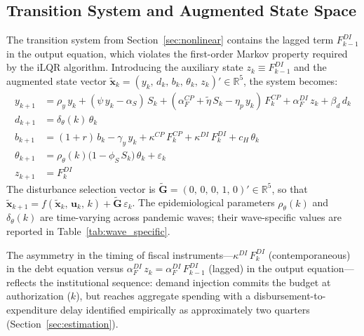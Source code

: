 \documentclass[12pt, a4paper]{article}
\begin{document}
\subsection{Transition System and Augmented State Space}
\label{app:system}

The transition system from Section~\ref{sec:nonlinear} contains the lagged term
$F_{k-1}^{DI}$ in the output equation, which violates the first-order Markov
property required by the iLQR algorithm. Introducing the auxiliary state
$z_k \equiv F_{k-1}^{DI}$ and the augmented state vector
$\tilde{\bm{x}}_k = (y_k,\, d_k,\, b_k,\, \theta_k,\, z_k)' \in \mathbb{R}^5$,
the system becomes:
%
\begin{align}
    y_{k+1} &= \rho_y\, y_k
              + (\psi\, y_k - \alpha_S)\, S_k
              + (\alpha_F^{CP} + \tilde{\eta}\, S_k - \eta_p\, y_k)\, F_k^{CP}
              + \alpha_F^{DI}\, z_k
              + \beta_d\, d_k
    \label{eq:y_aug} \\[1ex]
    d_{k+1} &= \delta_\theta(k)\, \theta_k
    \label{eq:d_aug} \\[1ex]
    b_{k+1} &= (1+r)\, b_k - \gamma_y\, y_k
              + \kappa^{CP}\, F_k^{CP}
              + \kappa^{DI}\, F_k^{DI}
              + c_H\, \theta_k
    \label{eq:b_aug} \\[1ex]
    \theta_{k+1} &= \rho_\theta(k)\bigl(1 - \phi_S\, S_k\bigr)\,\theta_k
              + \varepsilon_k
    \label{eq:theta_aug} \\[1ex]
    z_{k+1} &= F_k^{DI}
    \label{eq:z_aug}
\end{align}
%
The disturbance selection vector is
$\tilde{\bm{G}} = (0,\, 0,\, 0,\, 1,\, 0)' \in \mathbb{R}^5$, so that
$\tilde{\bm{x}}_{k+1} = f(\tilde{\bm{x}}_k,\, \bm{u}_k,\, k) +
\tilde{\bm{G}}\,\varepsilon_k$. The epidemiological parameters $\rho_\theta(k)$
and $\delta_\theta(k)$ are time-varying across pandemic waves; their
wave-specific values are reported in Table~\ref{tab:wave_specific}.

The asymmetry in the timing of fiscal instruments---$\kappa^{DI}\, F_k^{DI}$
(contemporaneous) in the debt equation versus $\alpha_F^{DI}\, z_k =
\alpha_F^{DI}\, F_{k-1}^{DI}$ (lagged) in the output equation---reflects the
institutional sequence: demand injection commits the budget at authorization
($k$), but reaches aggregate spending with a disbursement-to-expenditure delay
identified empirically as approximately two quarters
(Section~\ref{sec:estimation}).
\end{document}

